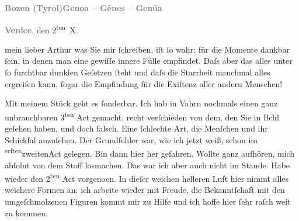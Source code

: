 \pstart
           \textcolor{gray}{\textbf{Bozen (Tyrol)}}\hfill \textcolor{gray}{\textbf{Genoa – Gênes – Genúa}}\pend
           
\pstart
           \raggedleft{}\textcolor{gray}{\textbf{Venice}}, den 2\textsuperscript{ten} X.\pend
           
\pstart{}mein lieber Arthur\pend\vspace{0.5em}
\pstart
           was Sie mir{ }ſchreiben, iſt{ }ſo wahr: für die Momente dankbar{ }ſein, in denen man eine
               gewiſſe innere Fülle empfindet. Daſs aber das alles unter{ }ſo furchtbar dunklen
               Geſetzen{ }ſteht und daſs die Starrheit manchmal alles ergreifen {\pb}kann,{ }ſogar die Empfindung für die
               Exiſtenz aller andern Menschen!\pend
           
\pstart
           Mit meinem Stück geht es{ }ſonderbar. Ich hab in Vahrn nochmals einen ganz
               unbrauchbaren 3\textsuperscript{ten} Act gemacht, recht verſchieden von
               dem, den Sie in Iſchl geſehen haben, und doch
               falsch. Eine{ }ſchlechte Art, die Menſchen und ihr Schickſal anzuſehen. Der Grundfehler
               war, wie ich jetzt weiß, schon im \substVorne{}\textsuperscript{erſten}\substDazwischen{}zweiten\substHinten{}{ }Act gelegen. Bin dann hier her
               gefahren. Wollte ganz aufhören, mich abſolut von dem Stoff losmachen. Das war ich
               aber auch nicht im Stande. Habe wieder den 2\textsuperscript{ten}{ }Act vorgeno{\geminationm}en. In dieſer weichen helleren Luft hier {\pb}nimmt alles weichere Formen an;
               ich arbeite wieder mit Freude, die Bekanntſchaft mit den umgeſchmolzenen Figuren
               kommt mir zu Hilfe und ich hoffe hier{ }ſehr raſch weit zu kommen.\pend
           
